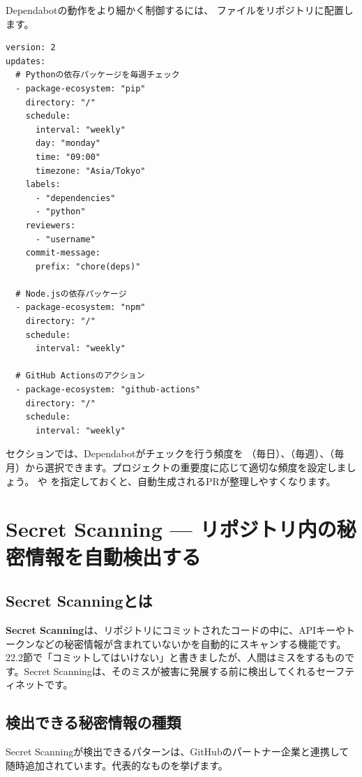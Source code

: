 Dependabotの動作をより細かく制御するには、 ファイルをリポジトリに配置します。

\begin{lstlisting}[language={}]
version: 2
updates:
  # Pythonの依存パッケージを毎週チェック
  - package-ecosystem: "pip"
    directory: "/"
    schedule:
      interval: "weekly"
      day: "monday"
      time: "09:00"
      timezone: "Asia/Tokyo"
    labels:
      - "dependencies"
      - "python"
    reviewers:
      - "username"
    commit-message:
      prefix: "chore(deps)"

  # Node.jsの依存パッケージ
  - package-ecosystem: "npm"
    directory: "/"
    schedule:
      interval: "weekly"

  # GitHub Actionsのアクション
  - package-ecosystem: "github-actions"
    directory: "/"
    schedule:
      interval: "weekly"
\end{lstlisting}

 セクションでは、Dependabotがチェックを行う頻度を （毎日）、（毎週）、（毎月）から選択できます。プロジェクトの重要度に応じて適切な頻度を設定しましょう。 や  を指定しておくと、自動生成されるPRが整理しやすくなります。

\section{Secret Scanning --- リポジトリ内の秘密情報を自動検出する}

\subsection{Secret Scanningとは}

\textbf{Secret Scanning}は、リポジトリにコミットされたコードの中に、APIキーやトークンなどの秘密情報が含まれていないかを自動的にスキャンする機能です。22.2節で「コミットしてはいけない」と書きましたが、人間はミスをするものです。Secret Scanningは、そのミスが被害に発展する前に検出してくれるセーフティネットです。

\subsection{検出できる秘密情報の種類}

Secret Scanningが検出できるパターンは、GitHubのパートナー企業と連携して随時追加されています。代表的なものを挙げます。


